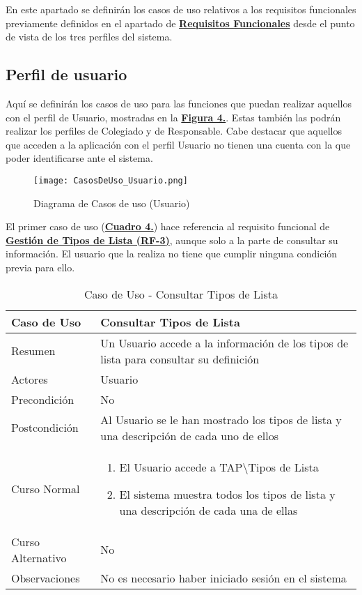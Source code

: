 En este apartado se definirán los casos de uso relativos a los requisitos funcionales previamente definidos en el apartado de \textbf{\hyperref[lrf]{Requisitos Funcionales}} desde el punto de vista de los tres perfiles del sistema.


\subsection{Perfil de usuario}


\addtocounter{figura_cap4}{1}
Aquí se definirán los casos de uso para las funciones que puedan realizar aquellos con el perfil de Usuario, mostradas en la \textbf{\hyperref[fig:CasosDeUso_Usuario]{Figura 4.}}. Estas también las podrán realizar los perfiles de Colegiado y de Responsable. Cabe destacar que aquellos que acceden a la aplicación con el perfil Usuario no tienen una cuenta con la que poder identificarse ante el sistema.

\begin{figure}[!htbp]
  \centering
  \texttt{[image: CasosDeUso\_Usuario.png]}
  \caption{Diagrama de Casos de uso (Usuario)}
  \label{fig:CasosDeUso_Usuario}
\end{figure}
\FloatBarrier

\addtocounter{tabla}{1}
El primer caso de uso (\textbf{\hyperref[tab:cuuConsultaTiposLst]{Cuadro 4.}}) hace referencia al requisito funcional de \textbf{\hyperref[tab:rfGestTipoLst]{Gestión de Tipos de Lista (RF-3)}}, aunque solo a la parte de consultar su información. El usuario que la realiza no tiene que cumplir ninguna condición previa para ello.

\begin{table}[!htbp]
  \centering  \addtocounter{casouso}{1}
  \begin{tabular}{|l | p{100mm}|}
    \textbf{Caso de Uso}  & \textbf{Consultar Tipos de Lista} \\ \hline
    Resumen 		 & Un Usuario accede a la información de los tipos de lista para consultar su definición \\ \hline
    Actores  		 & Usuario \\ \hline
    Precondición  	 & No \\ \hline
    Postcondición  	 & Al Usuario se le han mostrado los tipos de lista y una descripción de cada uno de ellos \\ \hline
    Curso Normal   	 & \begin{enumerate}
	  \item El Usuario accede a TAP\textbackslash Tipos de Lista
	  \item El sistema muestra todos los tipos de lista y una descripción de cada una de ellas
    \end{enumerate}  \\ \hline
    Curso Alternativo  & No  \\ \hline
    Observaciones 	 & No es necesario haber iniciado sesión en el sistema  \\ \hline
  \end{tabular}
  \caption{Caso de Uso  - Consultar Tipos de Lista}
  \label{tab:cuuConsultaTiposLst}
\end{table}
\FloatBarrier

